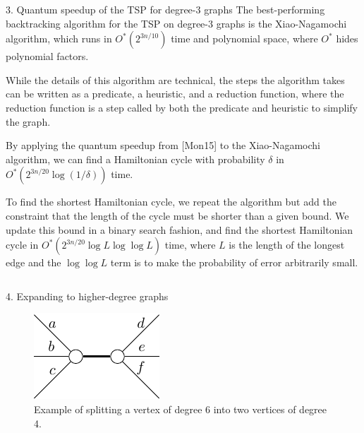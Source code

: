 \documentclass[]{templates/poster}
\begin{document}
\begin{frame}{}
\begin{columns}[t]
\begin{column}{0.422\linewidth}
\begin{block}{\Large 3. Quantum speedup of the TSP for degree-3 graphs}
  The best-performing backtracking algorithm for the TSP on degree-3 graphs is the Xiao-Nagamochi algorithm, which runs in $O^*(2^{3n/10})$ time and polynomial space, where $O^*$ hides polynomial factors.
  
  While the details of this algorithm are technical, the steps the algorithm takes can be written as a predicate, a heuristic, and a reduction function, where the reduction function is a step called by both the predicate and heuristic to simplify the graph.

  By applying the quantum speedup from [Mon15] to the Xiao-Nagamochi algorithm, we can find a Hamiltonian cycle with probability $\delta$ in $O^*(2^{3n/20}\log(1/\delta))$ time.
  
  To find the shortest Hamiltonian cycle, we repeat the algorithm but add the constraint that the length of the cycle must be shorter than a given bound. We update this bound in a binary search fashion, and find the shortest Hamiltonian cycle in $O^*(2^{3n/20}\log L\log\log L)$ time, where $L$ is the length of the longest edge and the $\log\log L$ term is to make the probability of error arbitrarily small.
  \end{block}
  \end{column}
\end{columns}
  
  \begin{columns}[t]
  \begin{column}{0.422\linewidth}

  \begin{block}{\Large 4. Expanding to higher-degree graphs}
  \begin{figure}
  \includegraphics[width=\linewidth]{deg5}
  \caption{Example of splitting a vertex of degree 6 into two vertices of degree 4.}
  \end{figure}


\end{block}
\end{column}
\end{columns}
\end{frame}
\end{document}
